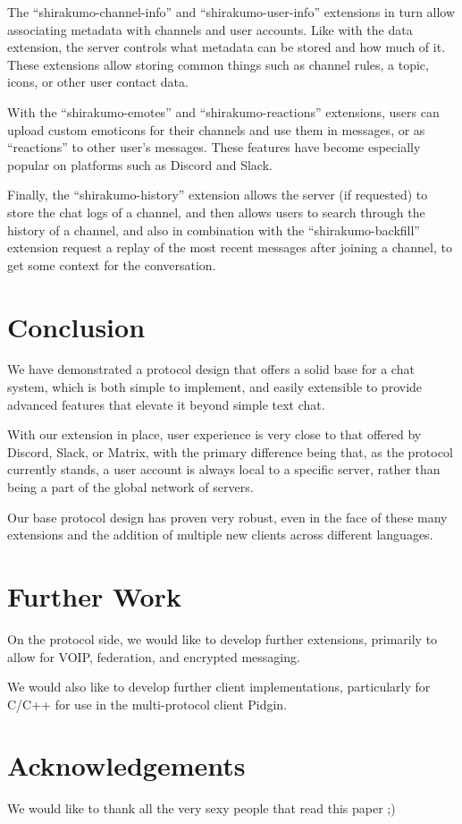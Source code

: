 \documentclass[format=sigconf]{acmart}
\begin{document}
The ``shirakumo-channel-info'' and ``shirakumo-user-info'' extensions in turn allow associating metadata with channels and user accounts. Like with the data extension, the server controls what metadata can be stored and how much of it. These extensions allow storing common things such as channel rules, a topic, icons, or other user contact data.

With the ``shirakumo-emotes'' and ``shirakumo-reactions'' extensions, users can upload custom emoticons for their channels and use them in messages, or as ``reactions'' to other user's messages. These features have become especially popular on platforms such as Discord and Slack.

Finally, the ``shirakumo-history'' extension allows the server (if requested) to store the chat logs of a channel, and then allows users to search through the history of a channel, and also in combination with the ``shirakumo-backfill'' extension request a replay of the most recent messages after joining a channel, to get some context for the conversation.

\section{Conclusion}\label{conclusion}
We have demonstrated a protocol design that offers a solid base for a chat system, which is both simple to implement, and easily extensible to provide advanced features that elevate it beyond simple text chat.

With our extension in place, user experience is very close to that offered by Discord, Slack, or Matrix, with the primary difference being that, as the protocol currently stands, a user account is always local to a specific server, rather than being a part of the global network of servers.

Our base protocol design has proven very robust, even in the face of these many extensions and the addition of multiple new clients across different languages.

\section{Further Work}\label{further-work}
On the protocol side, we would like to develop further extensions, primarily to allow for VOIP, federation, and encrypted messaging.

We would also like to develop further client implementations, particularly for C/C++ for use in the multi-protocol client Pidgin.

\section{Acknowledgements}\label{acknowledgements}
We would like to thank all the very sexy people that read this paper ;)


\end{document}
